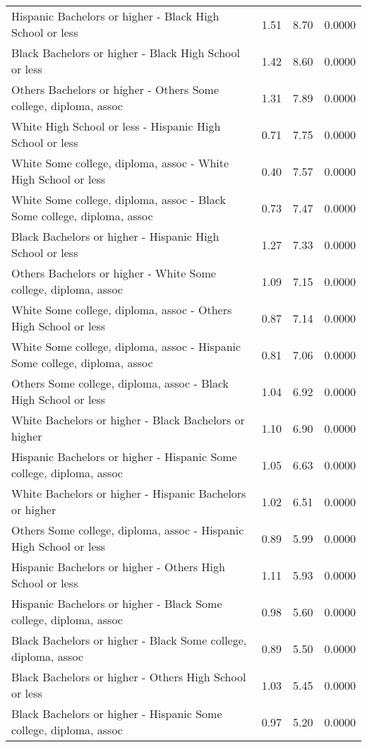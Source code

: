 \begin{center}
\begin{longtable}{lrrr}
    Hispanic Bachelors or higher -  Black High School or less & 1.51 & 8.70 & 0.0000 \\ 
    Black Bachelors or higher -  Black High School or less & 1.42 & 8.60 & 0.0000 \\ 
    Others Bachelors or higher -  Others Some college, diploma, assoc & 1.31 & 7.89 & 0.0000 \\ 
    White High School or less -  Hispanic High School or less & 0.71 & 7.75 & 0.0000 \\ 
    White Some college, diploma, assoc -  White High School or less & 0.40 & 7.57 & 0.0000 \\ 
    White Some college, diploma, assoc -  Black Some college, diploma, assoc & 0.73 & 7.47 & 0.0000 \\ 
    Black Bachelors or higher -  Hispanic High School or less & 1.27 & 7.33 & 0.0000 \\ 
    Others Bachelors or higher -  White Some college, diploma, assoc & 1.09 & 7.15 & 0.0000 \\ 
    White Some college, diploma, assoc -  Others High School or less & 0.87 & 7.14 & 0.0000 \\ 
    White Some college, diploma, assoc -  Hispanic Some college, diploma, assoc & 0.81 & 7.06 & 0.0000 \\ 
    Others Some college, diploma, assoc -  Black High School or less & 1.04 & 6.92 & 0.0000 \\ 
    White Bachelors or higher -  Black Bachelors or higher & 1.10 & 6.90 & 0.0000 \\ 
    Hispanic Bachelors or higher -  Hispanic Some college, diploma, assoc & 1.05 & 6.63 & 0.0000 \\
    White Bachelors or higher -  Hispanic Bachelors or higher & 1.02 & 6.51 & 0.0000 \\ 
    Others Some college, diploma, assoc -  Hispanic High School or less & 0.89 & 5.99 & 0.0000 \\ 
    Hispanic Bachelors or higher -  Others High School or less & 1.11 & 5.93 & 0.0000 \\ 
    Hispanic Bachelors or higher -  Black Some college, diploma, assoc & 0.98 & 5.60 & 0.0000 \\ 
    Black Bachelors or higher -  Black Some college, diploma, assoc & 0.89 & 5.50 & 0.0000 \\ 
    Black Bachelors or higher -  Others High School or less & 1.03 & 5.45 & 0.0000 \\ 
    Black Bachelors or higher -  Hispanic Some college, diploma, assoc & 0.97 & 5.20 & 0.0000 \\ 

\end{longtable}
\end{center}
